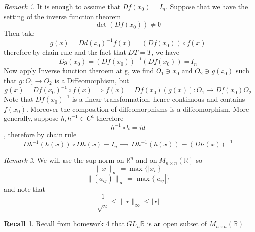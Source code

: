 \documentclass[11pt,openany]{book}
\theoremstyle{plain}
\theoremstyle{definition}
\newtheorem{recall}{Recall}[chapter]
\theoremstyle{remark}
\newtheorem{remark}{Remark}[chapter]
\newcommand{\R}{\mathbb{R}}
\begin{document}
\begin{remark}
    It is enough to assume that $Df(x_0) = I_n$. Suppose that we have the setting of the inverse function theorem \[ \det (Df(x_0)) \ne 0\] Then take \[g(x) = Dd(x_0)^{-1}f(x) = (Df(x_0)) \circ f(x)\] therefore by chain rule and the fact that $DT = T$, we have \[ Dg(x_0) = (Df(x_0))^{-1}(Df(x_0))= I_n\] Now apply Inverse function theroem at g, we find $O_1 \ni x_0$ and $O_2 \ni g(x_0)$ such that $g:O_1 \to O_2$ is a Diffeomorphism, but \[g(x) = Df(x_0)^{-1} \circ f(x) \implies  f(x) = Df(x_0)(g(x)): O_1 \to Df(x_0)O_2\] Note that $Df(x_0)^{-1}$ is a linear transformation, hence continuous and contains $f(x_0)$. Moreover the composition of diffeomorphisms is a diffeomorphism. More generally, suppose $h, h^{-1} \in C^1$ therefore \[h^{-1} \circ h = id\], therefore by chain rule \[Dh^{-1}(h(x)) \circ Dh(x) = I_n \implies Dh^{-1}(h(x)) = (Dh(x))^{-1}\] 
\end{remark}


\begin{remark}
    We will use the sup norm on $\R^n$ and on $M_{n \times n }(\R)$ so \[\|x\|_{\infty} = \max\{|x_i|\}\] \[\|(a_{ij})\|_{\infty} = \max\{|a_{ij}|\}\] and note that \[\frac{1}{\sqrt{n}} \le \|x\|_\infty \le |x|\]
\end{remark}

\begin{recall}
Recall from homework 4 that $GL_n{\R}$ is an open subset of $M_{n\times n}(\R)$
\end{recall}
\end{document}
